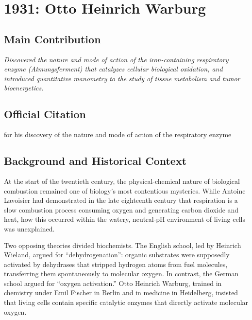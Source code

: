 \chapter[1931 --- Warburg]{1931: Otto Heinrich Warburg}
\label{ch:1931_ottoheinrichwarburg}

\section*{Main Contribution}

\textit{Discovered the nature and mode of action of the iron-containing respiratory enzyme (Atmungsferment) that catalyzes cellular biological oxidation, and introduced quantitative manometry to the study of tissue metabolism and tumor bioenergetics.}\cite{nobel-1931,lecture-1931,warburg-cancer-review}

\section{Official Citation}

for his discovery of the nature and mode of action of the respiratory enzyme

\section{Background and Historical Context}

At the start of the twentieth century, the physical-chemical nature of biological combustion remained one of biology's most contentious mysteries. While Antoine Lavoisier had demonstrated in the late eighteenth century that respiration is a slow combustion process consuming oxygen and generating carbon dioxide and heat, how this occurred within the watery, neutral-pH environment of living cells was unexplained. 

Two opposing theories divided biochemists. The English school, led by Heinrich Wieland, argued for ``dehydrogenation'': organic substrates were supposedly activated by dehydrases that stripped hydrogen atoms from fuel molecules, transferring them spontaneously to molecular oxygen. In contrast, the German school argued for ``oxygen activation.'' Otto Heinrich Warburg, trained in chemistry under Emil Fischer in Berlin and in medicine in Heidelberg, insisted that living cells contain specific catalytic enzymes that directly activate molecular oxygen.

